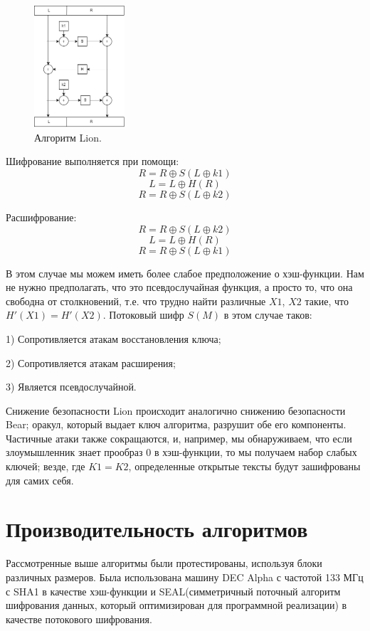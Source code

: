 \documentclass[12pt]{article}
\begin{document}
\begin{figure}
\centering
\includegraphics[width=0.3\textwidth]{Lion.png}
\caption{\label{fig:Lion}Алгоритм Lion.}
\end{figure}
\vspace{5mm}

\vspace{5mm}
Шифрование выполняется при помощи:
\[R = R\oplus S(L\oplus k1)\]
\[L = L\oplus H(R)\]
\[R = R\oplus S(L\oplus k2)\]

Расшифрование:
\[R = R\oplus S(L\oplus k2)\]
\[L = L\oplus H(R)\]
\[R = R\oplus S(L\oplus k1)\]

\vspace{5mm}
В этом случае мы можем иметь более слабое предположение о хэш-функции. Нам не
нужно предполагать, что это псевдослучайная функция, а просто то, что она
свободна от столкновений, т.е. что трудно найти различные $X1$, $X2$ такие, что $H'(X1) = H'(X2)$. Потоковый шифр $S(M)$ в этом случае таков: 

 1) Сопротивляется атакам восстановления ключа;
    
 2) Сопротивляется атакам расширения;

 3) Является псевдослучайной.

\vspace{5mm}
Снижение безопасности Lion происходит аналогично снижению безопасности Bear; оракул, который выдает ключ алгоритма, разрушит обе его компоненты. Частичные атаки также сокращаются, и, например, мы обнаруживаем, что если злоумышленник знает прообраз 0 в хэш-функции, то мы получаем набор слабых ключей; везде, где $K1 = K2$, определенные открытые тексты будут зашифрованы для самих себя. 


\section{Производительность алгоритмов}
Рассмотренные выше алгоритмы были протестированы, используя блоки различных размеров. Была использована машину DEC Alpha с частотой 133 МГц с SHA1 в качестве хэш-функции и SEAL(симметричный поточный алгоритм шифрования данных, который оптимизирован для программной реализации) в качестве потокового шифрования.
\end{document}
